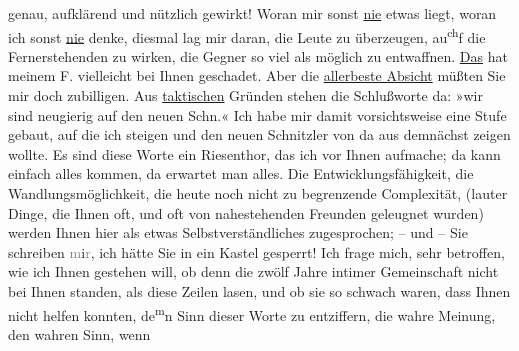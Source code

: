 \begin{ledgroupsized}[t]{13cm}
{                  genau}, aufklärend und nützlich gewirkt! Woran mir sonst \uline{nie} etwas liegt, woran ich sonst \uline{nie}
               denke, diesmal lag mir daran, die Leute zu überzeugen, au\substVorne{}\textsuperscript{ch}\substDazwischen{}f\substHinten{} die Fernerstehenden zu wirken, die Gegner so viel als möglich zu entwaffnen.
                  \uline{Das} hat meinem F. vielleicht bei Ihnen geschadet. Aber die \uline{allerbeste Absicht} müßten Sie mir doch zubilligen.\pend
           \pstart
           Aus \uline{taktischen} Gründen stehen die Schlußworte da:
                  »wir sind neugierig auf den
                  neuen Schn.« Ich habe mir damit vorsichtsweise eine Stufe gebaut, auf die ich
               steigen und den neuen Schnitzler von da aus demnächst zeigen wollte. Es sind diese
               Worte ein Riesenthor, das ich vor Ihnen aufmache; da kann einfach alles kommen, da
               erwartet man alles. Die Entwicklungsfähigkeit, die Wandlungsmöglichkeit, die heute
               noch nicht zu begrenzende Complexität, (lauter Dinge, die Ihnen oft, und oft von
               nahestehenden Freunden geleugnet wurden) werden Ihnen hier als etwas
               Selbstverständliches zugesprochen; – und – Sie schreiben
                  \textcolor{gray}{m}i\textcolor{gray}{r}, ich hätte Sie in ein Kastel
               gesperrt!\pend
           \pstart
           Ich frage mich, sehr betroffen, wie ich Ihnen gestehen will, ob denn die zwölf Jahre
               intimer Gemeinschaft nicht bei Ihnen standen, als \label{K_L03353-8v}\label{K_L03353-8h} diese Zeilen lasen, und ob sie so
               schwach waren,  dass \label{K_L03353-9v}\label{K_L03353-9h} Ihnen nicht helfen konnten, de\substVorne{}\textsuperscript{m}\substDazwischen{}n\substHinten{} Sinn dieser Worte zu entziffern, die wahre Meinung, den wahren Sinn, wenn

\end{ledgroupsized}
